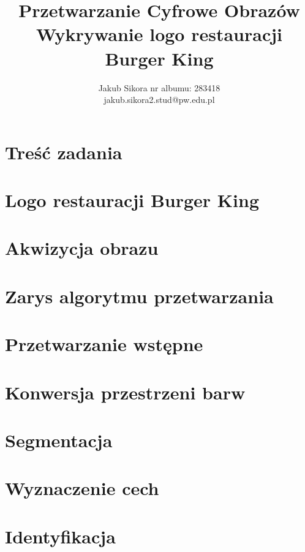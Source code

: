 \documentclass{article}
\title{Przetwarzanie Cyfrowe Obrazów \\ Wykrywanie logo restauracji Burger King}
\author{
Jakub Sikora
\affiliations
nr albumu: 283418\\
\emails
jakub.sikora2.stud@pw.edu.pl
}
\newcommand{\bk}{
    Burger King
}
\begin{document}
\maketitle

\section{Treść zadania}
\label{sec:cel-projektu}


\section{Logo restauracji \bk}
\label{sec:logo-bk}


\section{Akwizycja obrazu}
\label{sec:akwizycja-obrazu}


\section{Zarys algorytmu przetwarzania}
\label{sec:algorytm}


\section{Przetwarzanie wstępne}
\label{sec:preprocessing}


\section{Konwersja przestrzeni barw}
\label{sec:przestrzenie}


\section{Segmentacja}
\label{sec:segmentacja}


\section{Wyznaczenie cech}
\label{sec:wyznaczanie-cech}


\section{Identyfikacja}
\label{sec:identyfikacja-cech}

\end{document}
